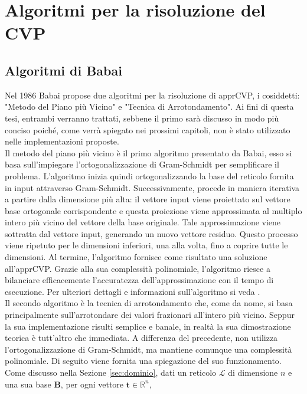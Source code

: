 \section{Algoritmi per la risoluzione del CVP}
\label{CVP}


\subsection{Algoritmi di Babai}
\label{sec:babai}
Nel 1986 Babai\cite{Babai86}  propose due algoritmi per la risoluzione di apprCVP, i cosiddetti:
"Metodo del Piano più Vicino" e "Tecnica di Arrotondamento". Ai fini di questa tesi, 
entrambi verranno trattati, sebbene il primo sarà discusso in modo più conciso 
poiché, come verrà spiegato nei prossimi capitoli, non è stato utilizzato nelle 
implementazioni proposte. \\
Il metodo del piano più vicino è il primo algoritmo presentato da Babai, esso si basa sull'impiegare 
l'ortogonalizzazione di Gram-Schmidt per semplificare il problema. L'algoritmo inizia quindi
ortogonalizzando la base del reticolo fornita in 
input attraverso Gram-Schmidt. Successivamente, procede in maniera iterativa a partire 
dalla dimensione più alta: il vettore input viene proiettato sul vettore base ortogonale 
corrispondente e questa proiezione viene approssimata al multiplo intero più vicino del 
vettore della base originale. Tale approssimazione viene sottratta dal vettore input, 
generando un nuovo vettore residuo. Questo processo viene ripetuto per le dimensioni 
inferiori, una alla volta, fino a coprire tutte le dimensioni. Al termine, l'algoritmo 
fornisce come risultato una soluzione all'apprCVP. 
Grazie alla sua complessità polinomiale, l'algoritmo riesce a bilanciare efficacemente 
l'accuratezza dell'approssimazione con il tempo di esecuzione. Per ulteriori dettagli e 
informazioni sull'algoritmo si veda \cite{Galbraith18}. 
\\
Il secondo algoritmo è la tecnica di arrotondamento che, come da nome, si basa
principalmente sull'arrotondare dei valori frazionari all'intero più vicino.
Seppur la sua implementazione risulti semplice e banale, in realtà la sua dimostrazione teorica
è tutt'altro che immediata. 
A differenza del precedente, 
non utilizza l'ortogonalizzazione di Gram-Schmidt, ma mantiene comunque una complessità 
polinomiale. Di seguito viene fornita una spiegazione del suo funzionamento. \\
Come discusso nella Sezione \ref{sec:dominio}, dati un reticolo $\mathcal{L}$ di dimensione
$n$ e una sua base $\mathbf{B}$, per ogni vettore $\mathbf{t} \in \mathbb{R}^n$,
